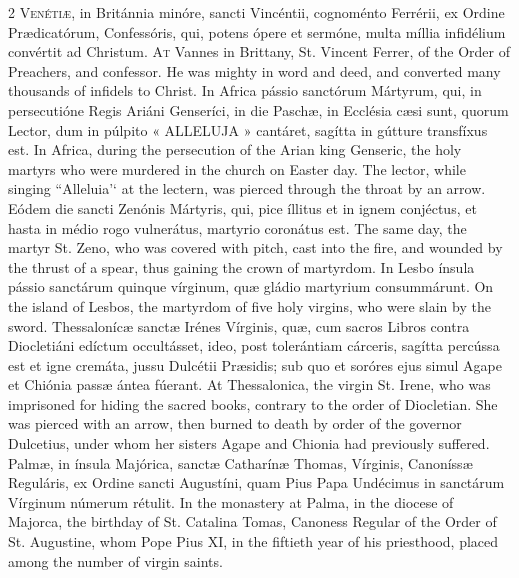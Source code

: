 \begin{paracol}{2}
\lettrine[lines=2]{V}{enétiæ,} in Británnia minóre, sancti Vincéntii, 
 cognoménto Ferrérii, ex Ordine Prædicatórum, Confessóris, qui, potens ópere 
 et sermóne, multa míllia infidélium convértit ad Christum.
\switchcolumn
{}
\lettrine[lines=2]{A}{t} Vannes in Brittany, St. Vincent Ferrer, of the Order of Preachers, and 
 confessor. He was mighty in word and deed, and converted many 
 thousands of infidels to Christ.
\switchcolumn*
{}
In Africa pássio sanctórum Mártyrum, qui, in persecutióne Regis Ariáni 
 Genseríci, in die Paschæ, in Ecclésia cæsi sunt, 
 quorum Lector, dum in púlpito « ALLELUJA » cantáret, sagítta in gútture 
 transfíxus est.
\switchcolumn
{}
In Africa, during the persecution of the Arian king Genseric, the holy 
 martyrs who were murdered in the church on Easter day. The lector, 
 while singing ``Alleluia'` at the lectern, was pierced through the throat by 
 an arrow.
\switchcolumn*
{}
Eódem die sancti Zenónis Mártyris, qui, pice íllitus et in ignem conjéctus, 
 et hasta in médio rogo vulnerátus, martyrio coronátus est.
\switchcolumn
{}
The same day, the martyr St. Zeno, who was covered with pitch, cast into the 
 fire, and wounded by the thrust of a spear, thus gaining the crown of 
 martyrdom.
\switchcolumn*
{}
In Lesbo ínsula pássio sanctárum quinque vírginum, quæ 
 gládio martyrium consummárunt.
\switchcolumn
{}
On the island of Lesbos, the martyrdom of five holy virgins, who were slain 
 by the sword.
\switchcolumn*
{}
Thessalonícæ sanctæ Irénes Vírginis, quæ, cum 
 sacros Libros contra Diocletiáni edíctum occultásset, ideo, post tolerántiam cárceris, sagítta percússa est et igne cremáta, jussu Dulcétii Præsidis; sub 
 quo et soróres ejus simul Agape et Chiónia passæ ántea fúerant.
\switchcolumn
{}
At Thessalonica, the virgin St. Irene, who was imprisoned for hiding the 
 sacred books, contrary to the order of Diocletian. She was pierced 
 with an arrow, then burned to death by order of the governor Dulcetius, 
 under whom her sisters Agape and Chionia had previously suffered.
\switchcolumn*
{}
Palmæ, in ínsula Majórica, sanctæ Catharínæ 
 Thomas, Vírginis, Canoníssæ Reguláris, ex Ordine sancti Augustíni, quam Pius 
 Papa Undécimus in sanctárum Vírginum númerum rétulit.
\switchcolumn
{}
In the monastery at Palma, in the diocese of Majorca, the birthday of St. 
 Catalina Tomas, Canoness Regular of the Order of St. Augustine, whom Pope 
 Pius XI, in the fiftieth year of his priesthood, placed among the number of 
 virgin saints.
\switchcolumn*
{}
\end{paracol}


